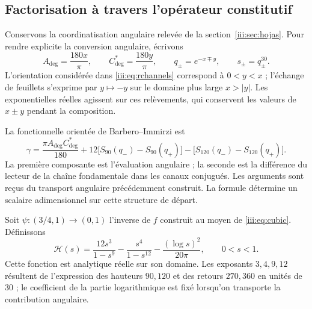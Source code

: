 \subsection{Factorisation à travers l’opérateur constitutif}

Conservons la coordinatisation angulaire relevée de la
section~\ref{iii:sec:hojas}. Pour rendre explicite la conversion angulaire,
écrivons
\begin{equation}
 A_{\deg}=\frac{180x}{\pi},\qquad
 C^*_{\deg}=\frac{180y}{\pi},\qquad
 q_\pm=e^{-x\mp y},\qquad s_\pm=q_\pm^{30}.
 \label{iii:eq:barbero-angular-lift}
\end{equation}
L’orientation considérée dans \eqref{iii:eq:rchannels} correspond à
$0<y<x$ ; l’échange de feuillets s’exprime par $y\mapsto-y$ sur le
domaine plus large $x>|y|$. Les exponentielles réelles agissent sur ces
relèvements, qui conservent les valeurs de $x\pm y$ pendant la
composition.

La fonctionnelle orientée de Barbero--Immirzi est
\begin{equation}
 \gamma=\frac{\pi A_{\deg}C^*_{\deg}}{180}
   +12\bigl[S_{90}(q_-)-S_{90}(q_+)\bigr]
   -\bigl[S_{120}(q_-)-S_{120}(q_+)\bigr].
 \label{iii:eq:barbero-functional}
\end{equation}
La première composante est l’évaluation angulaire ; la seconde est la
différence du lecteur de la chaîne fondamentale dans les canaux conjugués.
Les arguments sont reçus du transport angulaire précédemment construit.
La formule détermine un scalaire adimensionnel sur cette structure de
départ.

Soit $\psi:(3/4,1)\to(0,1)$ l’inverse de $f$ construit au moyen de
\eqref{iii:eq:cubic}. Définissons
\begin{equation}
 \mathcal H(s)=\frac{12s^3}{1-s^9}
             -\frac{s^4}{1-s^{12}}
             -\frac{(\log s)^2}{20\pi},\qquad 0<s<1.
 \label{iii:eq:barbero-h}
\end{equation}
Cette fonction est analytique réelle sur son domaine. Les exposants $3,4,9,12$
résultent de l’expression des hauteurs $90,120$ et des retours $270,360$ en
unités de $30$ ; le coefficient de la partie logarithmique est fixé lorsqu’on
transporte la contribution angulaire.

